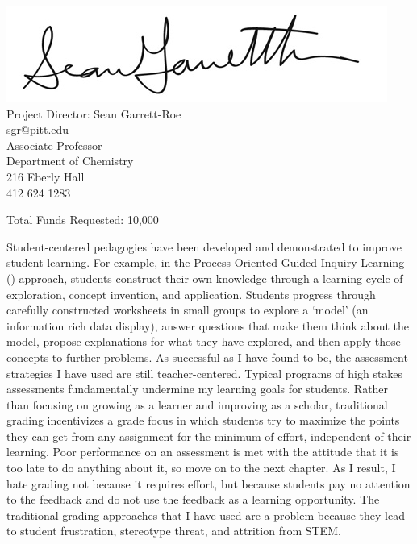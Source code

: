 \documentclass[10pt,letterpaper]{article}
\begin{document}
\newpage
\vspace*{\fill}
\begin{center}

\vspace{2\baselineskip}

\includegraphics[scale=1.2]{sgr_signature_2011_v2.jpg}\\
Project Director: Sean Garrett-Roe \\
\href{mailto:sgr@pitt.edu}{sgr@pitt.edu}\\
Associate Professor\\
Department of Chemistry\\
216 Eberly Hall\\
412 624 1283

\vspace{2\baselineskip}
 
Total Funds Requested: 10,000 

\end{center}
\vspace{\fill}


\newpage
{} %

Student-centered pedagogies have been developed and demonstrated to improve student learning. 
For example, in the Process Oriented Guided Inquiry Learning (\pogil) approach, students construct their own knowledge
through a learning cycle of exploration, concept invention, and application.
Students progress through carefully constructed worksheets in small groups to explore a `model' (an information rich data display), answer questions that make them think about the model, propose explanations for what they have explored, and then apply those concepts to further problems.
% 
As successful as I have found \pogil to be, the assessment strategies I have used are still teacher-centered. Typical programs of high stakes assessments fundamentally undermine my learning goals for students. Rather than focusing on growing as a learner and improving as a scholar, traditional grading incentivizes a grade focus in which students try to maximize the points they can get from any assignment for the minimum of effort, independent of their learning. Poor performance on an assessment is met with the attitude that it is too late to do anything about it, so move on to the next chapter. As I result, I hate grading not because it requires effort, but because students pay no attention to the feedback and do not use the feedback as a learning opportunity. 
The traditional grading approaches that I have used are a problem because they lead to student frustration, stereotype threat, and attrition from STEM. 
\end{document}
